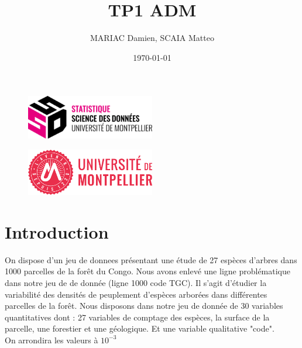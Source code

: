 \documentclass{article}
\title{TP1 ADM}
\author{MARIAC Damien, SCAIA Matteo}
\date{\today}
\begin{document}
\maketitle

\begin{figure}[h] 
    \centering
    \includegraphics[width=0.5\textwidth]{ssd_logo.png} 
\end{figure}

\begin{figure}[h] 
    \centering
    \includegraphics[width=0.5\textwidth]{logo_um_2022_rouge_RVB.png} 
\end{figure}

\newpage
\tableofcontents
\newpage

\section{Introduction}
On dispose d'un jeu de donnees présentant une étude de 27 espèces d'arbres dans 1000 parcelles de la forêt du Congo.
Nous avons enlevé une ligne problématique dans notre jeu de de donnée (ligne 1000 code TGC).
Il s'agit d'étudier la variabilité des densités de peuplement d'espèces arborées dans différentes parcelles de la forêt.
Nous disposons dans notre jeu de donnée de 30 variables quantitatives dont : 27 variables de comptage des espèces, la surface de la parcelle, une forestier et une géologique.
Et une variable qualitative "code".
\\
On arrondira les valeurs à $10^{-3}$
\end{document}
